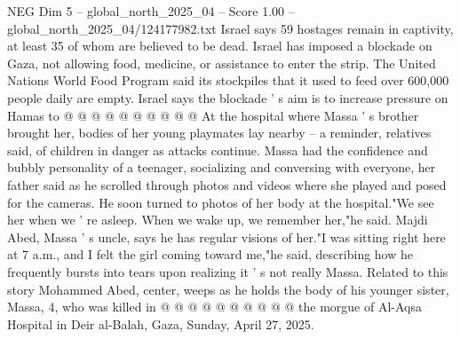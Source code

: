 \begin{textsample}{NEG Dim 5 – global\_north\_2025\_04 – Score 1.00 – global\_north\_2025\_04/124177982.txt}
Israel says 59 hostages remain in captivity, at least 35 of whom are believed to be dead.
Israel has imposed a blockade on Gaza, not allowing food, medicine, or assistance to enter the strip.
The United Nations World Food Program said its stockpiles that it used to feed over 600,000 people daily are empty.
Israel says the blockade ' s aim is to increase pressure on Hamas to @ @ @ @ @ @ @ @ @ @ At the hospital where Massa ' s brother brought her, bodies of her young playmates lay nearby -- a reminder, relatives said, of children in danger as attacks continue.
Massa had the confidence and bubbly personality of a teenager, socializing and conversing with everyone, her father said as he scrolled through photos and videos where she played and posed for the cameras.
He soon turned to photos of her body at the hospital."We see her when we ' re asleep.
When we wake up, we remember her,"he said.
Majdi Abed, Massa ' s uncle, says he has regular visions of her."I was sitting right here at 7 a.m., and I felt the girl coming toward me,"he said, describing how he frequently bursts into tears upon realizing it ' s not really Massa.
Related to this story Mohammed Abed, center, weeps as he holds the body of his younger sister, Massa, 4, who was killed in @ @ @ @ @ @ @ @ @ @ the morgue of Al-Aqsa Hospital in Deir al-Balah, Gaza, Sunday, April 27, 2025.

\end{textsample}
